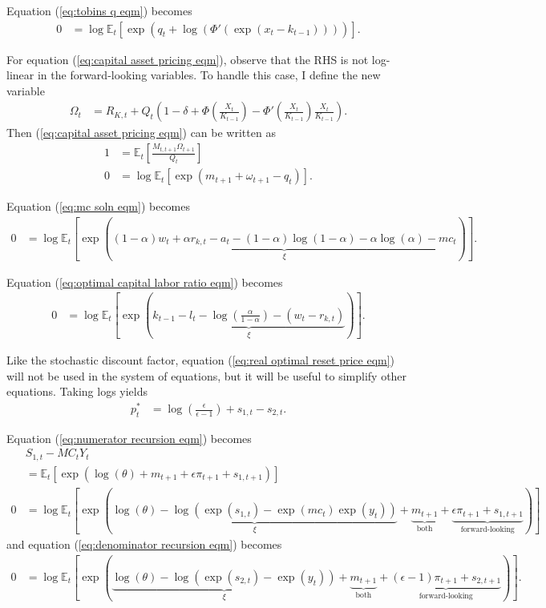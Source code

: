 \documentclass[12 pt, oneside]{article}
\theoremstyle{definition}
\theoremstyle{definition}
\theoremstyle{definition}
\newcommand{\E}{\mathbb{E}}
\begin{document}
Equation (\ref{eq:tobins q eqm}) becomes
\begin{align*}
  0 & = \log\E_t\left[\exp\left(q_t + \log\left(\Phi'\left(\exp(x_t - k_{t - 1})\right)\right)\right)\right].
\end{align*}

For equation (\ref{eq:capital asset pricing eqm}), observe that the RHS is not log-linear in the forward-looking variables. To handle this case, I define the new variable
\begin{align}\label{eq:Omega defn}
  \Omega_t & = R_{K, t} + Q_t\left(1 - \delta + \Phi\left(\frac{X_t}{K_{t - 1}}\right) - \Phi'\left(\frac{X_t}{K_{t - 1}}\right)\frac{X_t}{K_{t - 1}}\right).
\end{align}
Then (\ref{eq:capital asset pricing eqm}) can be written as
\begin{align*}
  1 & = \E_t\left[\frac{M_{t, t + 1} \Omega_{t + 1}}{Q_t}\right]\\
  0 & = \log\E_t\left[\exp(m_{t + 1} + \omega_{t + 1} - q_t)\right].
\end{align*}

Equation (\ref{eq:mc soln eqm}) becomes
\begin{align*}
  0 & = \log\E_t\left[\exp\left(\underbrace{(1 - \alpha)w_t + \alpha r_{k, t} - a_t -(1 - \alpha)\log(1 - \alpha) - \alpha \log(\alpha) - mc_t}_{\xi} \right)\right].
\end{align*}

Equation (\ref{eq:optimal capital labor ratio eqm}) becomes
\begin{align*}
  0 & = \log\E_t\left[\exp\left(\underbrace{k_{t - 1} - l_t - \log\left(\frac{\alpha}{1 - \alpha}\right) - (w_t - r_{k, t})}_{\xi} \right)\right].
\end{align*}

Like the stochastic discount factor, equation (\ref{eq:real optimal reset price eqm}) will not be used in the system of equations, but it will be useful to simplify other equations. Taking logs yields
\begin{align*}
  p_t^* & = \log\left(\frac{\epsilon}{\epsilon - 1}\right) + s_{1, t} - s_{2, t}.
\end{align*}

Equation (\ref{eq:numerator recursion eqm}) becomes
\begin{align*}
  & S_{1, t} - MC_t Y_t\\
   & = \E_t\left[\exp\left(\log(\theta) + m_{t + 1} + \epsilon \pi_{t + 1} + s_{1, t + 1}\right)\right]\\
  0 & = \log\E_t\left[\exp\left(\underbrace{\log(\theta) - \log(\exp(s_{1, t}) - \exp(mc_t)\exp(y_t))}_{\xi} + \underbrace{m_{t + 1}}_{\text{both}} + \underbrace{\epsilon \pi_{t + 1} + s_{1, t + 1}}_{\text{forward-looking}}\right)\right]
\end{align*}
and equation (\ref{eq:denominator recursion eqm}) becomes
\begin{align*}
  0 & = \log\E_t\left[\exp\left(\underbrace{\log(\theta) - \log(\exp(s_{2, t}) - \exp(y_t))}_{\xi} + \underbrace{m_{t + 1}}_{\text{both}} + \underbrace{(\epsilon - 1) \pi_{t + 1} + s_{2, t + 1}}_{\text{forward-looking}}\right)\right].
\end{align*}
\end{document}
